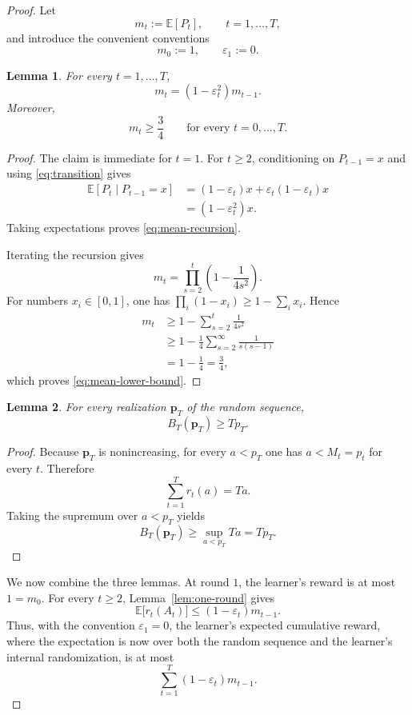 \documentclass[11pt]{article}
\newtheorem{lemma}{Lemma}
\theoremstyle{remark}
\newcommand{\E}{\mathbb{E}}
\newcommand{\bp}{\boldsymbol{p}}
\begin{document}
\begin{proof}
Let
\[
m_t:=\E[P_t],
\qquad t=1,\ldots,T,
\]
and introduce the convenient conventions
\[
m_0:=1,
\qquad
\varepsilon_1:=0.
\]

\begin{lemma}
\label{lem:price-path}
For every $t=1,\ldots,T$,
\[
m_t=(1-\varepsilon_t^2)m_{t-1}.
\tag{3}
\label{eq:mean-recursion}
\]
Moreover,
\[
m_t\ge\frac34
\qquad\text{for every }t=0,\ldots,T.
\tag{4}
\label{eq:mean-lower-bound}
\]
\end{lemma}

\begin{proof}
The claim is immediate for $t=1$.  For $t\ge2$, conditioning on
$P_{t-1}=x$ and using \eqref{eq:transition} gives
\[
\begin{aligned}
\E[P_t\mid P_{t-1}=x]
&=(1-\varepsilon_t)x
  +\varepsilon_t(1-\varepsilon_t)x\\
&=(1-\varepsilon_t^2)x.
\end{aligned}
\]
Taking expectations proves \eqref{eq:mean-recursion}.

Iterating the recursion gives
\[
m_t
=
\prod_{s=2}^t\left(1-\frac{1}{4s^2}\right).
\]
For numbers $x_i\in[0,1]$, one has
$\prod_i(1-x_i)\ge1-\sum_i x_i$.  Hence
\[
\begin{aligned}
m_t
&\ge
1-\sum_{s=2}^t\frac{1}{4s^2}\\
&\ge
1-\frac14\sum_{s=2}^{\infty}\frac{1}{s(s-1)}\\
&=1-\frac14
=
\frac34,
\end{aligned}
\]
which proves \eqref{eq:mean-lower-bound}.
\end{proof}

\begin{lemma}
\label{lem:benchmark}
For every realization $\bp_T$ of the random sequence,
\[
B_T(\bp_T)\ge T p_T.
\]
\end{lemma}

\begin{proof}
Because $\bp_T$ is nonincreasing, for every $a<p_T$ one has
$a<M_t=p_t$ for every $t$.  Therefore
\[
\sum_{t=1}^T r_t(a)=Ta.
\]
Taking the supremum over $a<p_T$ yields
\[
B_T(\bp_T)\ge\sup_{a<p_T}Ta=Tp_T.
\]
\end{proof}

We now combine the three lemmas.  At round $1$, the learner's reward is
at most $1=m_0$.  For every $t\ge2$, Lemma~\ref{lem:one-round} gives
\[
\E\bigl[r_t(A_t)\bigr]
\le
(1-\varepsilon_t)m_{t-1}.
\]
Thus, with the convention $\varepsilon_1=0$, the learner's expected
cumulative reward, where the expectation is now over both the random
sequence and the learner's internal randomization, is at most
\[
\sum_{t=1}^T(1-\varepsilon_t)m_{t-1}.
\tag{5}
\label{eq:learner-upper-bound}
\]


\end{proof}
\end{document}
